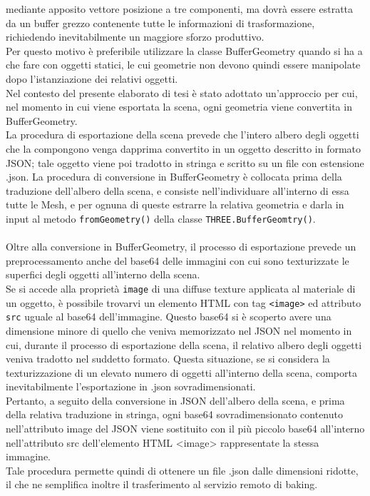 mediante apposito vettore posizione a tre componenti, ma dovrà essere estratta da un buffer grezzo contenente tutte le informazioni di trasformazione, richiedendo inevitabilmente un maggiore sforzo produttivo.
\\
Per questo motivo è preferibile utilizzare la classe BufferGeometry quando si ha a che fare con oggetti statici, le cui geometrie non devono quindi essere manipolate dopo l’istanziazione dei relativi oggetti.
\\
Nel contesto del presente elaborato di tesi è stato adottato un’approccio per cui, nel momento in cui viene esportata la scena, ogni geometria viene convertita in BufferGeometry.    
\\
La procedura di esportazione della scena prevede che l’intero albero degli oggetti che la compongono venga dapprima convertito in un oggetto descritto in formato JSON; tale oggetto viene poi tradotto in stringa e scritto su un file con estensione .json. La procedura di conversione in BufferGeometry è collocata prima della traduzione dell’albero della scena, e consiste nell’individuare all’interno di essa tutte le Mesh, e per ognuna di queste estrarre la relativa geometria e darla in input al metodo \texttt{fromGeometry()} della classe \texttt{THREE.BufferGeomtry()}. 
\\
\\
Oltre alla conversione in BufferGeometry, il processo di esportazione prevede un preprocessamento anche del base64 delle immagini con cui sono texturizzate le superfici degli oggetti all’interno della scena. 
\\
Se si accede alla proprietà \texttt{image} di una diffuse texture applicata al materiale di un oggetto, è possibile trovarvi un elemento HTML con tag \texttt{<image>} ed attributo \texttt{src} uguale al base64 dell’immagine. Questo base64 si è scoperto avere una dimensione minore di quello che veniva memorizzato nel JSON nel momento in cui, durante il processo di esportazione della scena, il relativo albero degli oggetti veniva tradotto nel suddetto formato. Questa situazione, se si considera la texturizzazione di un elevato numero di oggetti all’interno della scena, comporta inevitabilmente l’esportazione in .json sovradimensionati. 
\\
Pertanto, a seguito della conversione in JSON dell’albero della scena, e prima della relativa traduzione in stringa, ogni base64 sovradimensionato contenuto nell’attributo image del JSON viene sostituito con il più piccolo base64 all’interno nell’attributo src dell’elemento HTML <image> rappresentate la stessa immagine.
\\
Tale procedura permette quindi di ottenere un file .json dalle dimensioni ridotte, il che ne semplifica inoltre il trasferimento al servizio remoto di baking. 

